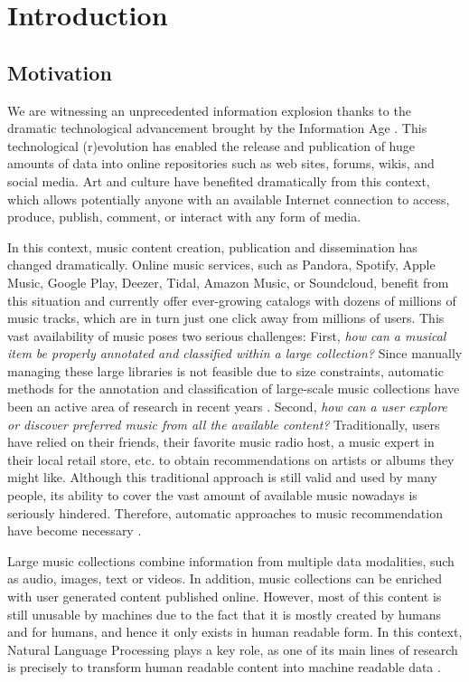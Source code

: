 
\chapter{Introduction}
\label{sec:intro}

\section{Motivation}
\label{sec:intro:motivation}

We are witnessing an unprecedented information explosion thanks to the dramatic technological advancement brought by the Information Age \citep{smith2009social}. This technological (r)evolution has enabled the release and publication of huge amounts of data into online repositories such as web sites, forums, wikis, and social media. Art and culture have benefited dramatically from this context, which allows potentially anyone with an available Internet connection to access, produce, publish, comment, or interact with any form of media. 

In this context, music content creation, publication and dissemination has changed dramatically. Online music services, such as Pandora, Spotify, Apple Music, Google Play, Deezer, Tidal, Amazon Music, or Soundcloud, benefit from this situation and currently offer ever-growing catalogs with dozens of millions of music tracks, which are in turn just one click away from millions of users. This vast availability of music poses two serious challenges: First, \textit{how can a musical item be properly annotated and classified within a large collection?} Since manually managing these large libraries is not feasible due to size constraints, automatic methods for the annotation and classification of large-scale music collections have been an active area of research in recent years \citep{Schedl2014}. Second, \textit{how can a user explore or discover preferred music from all the available content?} Traditionally, users have relied on their friends, their favorite music radio host, a music expert in their local retail store, etc. to obtain recommendations on artists or albums they might like. Although this traditional approach is still valid and used by many people, its ability to cover the vast amount of available music nowadays is seriously hindered. Therefore, automatic approaches to music recommendation have become necessary \citep{celma2008new}.

Large music collections combine information from multiple data modalities, such as audio, images, text or videos. In addition, music collections can be enriched with user generated content published online. However, most of this content is still unusable by machines due to the fact that it is mostly created by humans and for humans, and hence it only exists in human readable form. In this context, Natural Language Processing plays a key role, as one of its main lines of research is precisely to transform human readable content into machine readable data \citep{cowie1996information}. %

